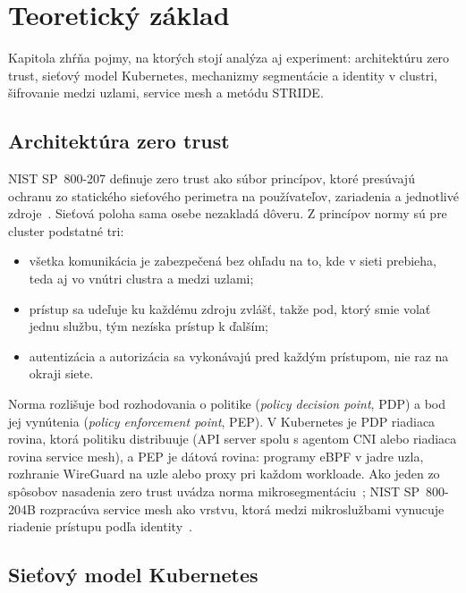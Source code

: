 \chapter{Teoretický základ}
\label{ch:theory}

Kapitola zhŕňa pojmy, na ktorých stojí analýza aj experiment: architektúru zero trust, sieťový model Kubernetes, mechanizmy segmentácie a identity v clustri, šifrovanie medzi uzlami, service mesh a metódu STRIDE.

\section{Architektúra zero trust}
\label{sec:zero-trust}

NIST SP~800-207 definuje zero trust ako súbor princípov, ktoré presúvajú ochranu zo statického sieťového perimetra na používateľov, zariadenia a jednotlivé zdroje~\cite{nist-sp800-207}. Sieťová poloha sama osebe nezakladá dôveru. Z princípov normy sú pre cluster podstatné tri:

\begin{itemize}
  \item všetka komunikácia je zabezpečená bez ohľadu na to, kde v sieti prebieha, teda aj vo vnútri clustra a medzi uzlami;
  \item prístup sa udeľuje ku každému zdroju zvlášť, takže pod, ktorý smie volať jednu službu, tým nezíska prístup k ďalším;
  \item autentizácia a autorizácia sa vykonávajú pred každým prístupom, nie raz na okraji siete.
\end{itemize}

Norma rozlišuje bod rozhodovania o politike (\emph{policy decision point}, PDP) a bod jej vynútenia (\emph{policy enforcement point}, PEP). V Kubernetes je PDP riadiaca rovina, ktorá politiku distribuuje (API server spolu s agentom CNI alebo riadiaca rovina service mesh), a PEP je dátová rovina: programy eBPF v jadre uzla, rozhranie WireGuard na uzle alebo proxy pri každom workloade. Ako jeden zo spôsobov nasadenia zero trust uvádza norma mikrosegmentáciu~\cite{nist-sp800-207}; NIST SP~800-204B rozpracúva service mesh ako vrstvu, ktorá medzi mikroslužbami vynucuje riadenie prístupu podľa identity~\cite{nist-sp800-204b}.

\section{Sieťový model Kubernetes}
\label{sec:k8s-networking}

